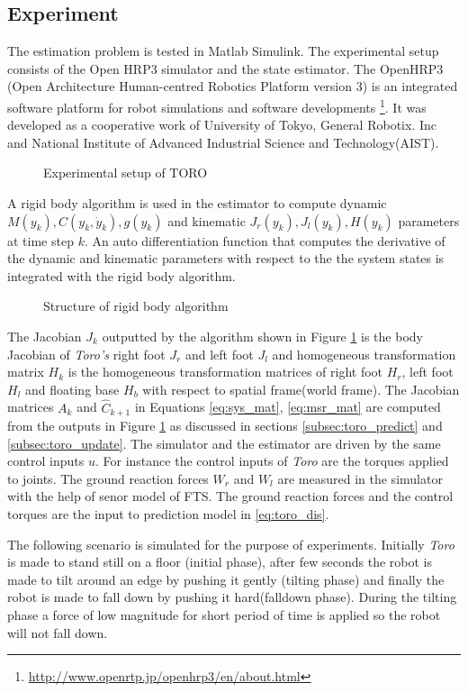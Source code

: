 \subsection{Experiment}
The estimation problem is tested in Matlab Simulink. The experimental setup consists of the Open HRP3 simulator and the state estimator. The OpenHRP3 (Open Architecture Human-centred Robotics Platform version 3) is an integrated software platform for robot simulations and software developments \footnote{\url{http://www.openrtp.jp/openhrp3/en/about.html}}. It was developed as a cooperative work of University of Tokyo, General Robotix. Inc and National Institute of Advanced Industrial Science and Technology(AIST).

\begin{figure}
    \centering
    
    \caption{Experimental setup of TORO}
\end{figure}

A rigid body algorithm is used in the estimator to compute dynamic $M(y_k), C(y_k,\dot y_k), g(y_k)$ and kinematic $J_r(y_k), J_l(y_k), H(y_k)$ parameters at time step $k$. An auto differentiation function that computes the derivative of the dynamic and kinematic parameters with respect to the the system states is integrated with the rigid body algorithm. 
\begin{figure}[h]
    \centering
    
    \caption{Structure of rigid body algorithm}
    \label{fig:luc_dyn}
\end{figure}
The Jacobian $J_k$ outputted by the algorithm shown in Figure \ref{fig:luc_dyn} is the body Jacobian of \emph{Toro's} right foot $J_r$ and left foot $J_l$ and homogeneous transformation matrix $H_k$ is the homogeneous transformation matrices of right foot $H_r$, left foot $H_l$ and floating base $H_b$ with respect to spatial frame(world frame).
The Jacobian matrices $A_k$ and $\hat C_{k+1}$ in Equations \ref{eq:sys_mat}, \ref{eq:msr_mat} are computed from the outputs in Figure \ref{fig:luc_dyn} as discussed in sections \ref{subsec:toro_predict} and \ref{subsec:toro_update}. The simulator and the estimator are driven by the same control inputs $u$. For instance the control inputs of \emph{Toro} are the torques applied to joints. The ground reaction forces $W_r$ and $W_l$ are measured in the simulator with the help of senor model of FTS. The ground reaction forces and the control torques are the input to prediction model in \ref{eq:toro_dis}.

The following scenario is simulated for the purpose of experiments. Initially \emph{Toro} is made to stand still on a floor (initial phase), after few seconds the robot is made to tilt around an edge by pushing it gently (tilting phase) and finally the robot is made to fall down by pushing it hard(falldown phase). During the tilting phase a force of low magnitude for short period of time is applied so the robot will not fall down.

